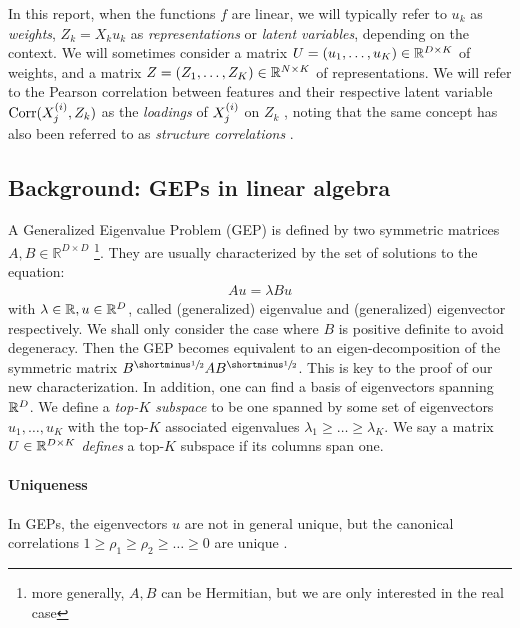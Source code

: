 In this report, when the functions $f$ are linear, we will typically refer to $u_k$ as \textit{\gls{weights}}, $Z_k = X_k u_k$ as \textit{\gls{representations}} or \textit{\gls{latent variables}}, depending on the context. We will sometimes consider a
matrix $U = \left(u_1, \dots, u_K\right) \in \mathbb{R}^{D \times K}$ of \gls{weights}, and a
matrix $Z = \left(Z_1, \dots, Z_K\right) \in \mathbb{R}^{N \times K}$ of representations.
We will refer to the Pearson correlation between features and their respective latent variable $\operatorname{Corr}(X^{(i)}_j, Z_k)$ as the \textit{\gls{loadings}} of $X^{(i)}_j$ on $Z_k$ \citep{rosipal2005overview, alpert1972interpretation}, noting that the same concept has also been referred to as \textit{structure correlations} \citep{meredith1964canonical}.

\subsection{Background: GEPs in linear algebra}
A Generalized Eigenvalue Problem (GEP) is defined by two symmetric matrices $A,B\in \mathbb{R}^{D\times D}$ \citep{stewart_matrix_1990}\footnote{more generally, $A,B$ can be Hermitian, but we are only interested in the real case}. They are usually characterized by the set of solutions to the equation:
\begin{align}
    \label{eq:igep}
    Au=\lambda Bu
\end{align}
with $\lambda \in \mathbb{R}, u \in \mathbb{R}^D$, called (generalized) eigenvalue and (generalized) eigenvector respectively. We shall only consider the case where $B$ is positive definite to avoid degeneracy.
Then the GEP becomes equivalent to an eigen-decomposition of the symmetric matrix $B^\mhalf A B^\mhalf$. This is key to the proof of our new characterization.
In addition, one can find a basis of eigenvectors spanning $\mathbb{R}^D$.
We define a \textit{top-$K$ subspace} to be one spanned by some set of eigenvectors {$u_1,\dots,u_K$} with the top-$K$ associated eigenvalues $\lambda_1 \geq \dots \geq \lambda_K$.
We say a matrix $U \in \mathbb{R}^{D \times K}$ \textit{defines} a top-$K$ subspace if its columns span one.

\paragraph{Uniqueness}
In GEPs, the eigenvectors $u$ are not in general unique, but the canonical correlations $1 \geq \rho_1 \geq \rho_2 \geq \dots \geq 0$ are unique \citep{mills1988calculation}.

